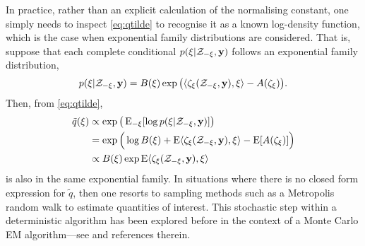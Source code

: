 In practice, rather than an explicit calculation of the normalising constant, one simply needs to inspect \cref{eq:qtilde} to recognise it as a known log-density function, which is the case when exponential family distributions are considered.
That is, suppose that each complete conditional $p(\xi|{\mathcal Z}_{-\xi}, {\mathbf y})$ follows an exponential family distribution,
\[
  p(\xi|{\mathcal Z}_{-\xi}, {\mathbf y}) = B(\xi)\exp \big(\langle\zeta_\xi({\mathcal Z}_{-\xi}, {\mathbf y}) , \xi\rangle - A(\zeta_\xi) \big).
\]
Then, from \cref{eq:qtilde},
\begin{align*}
  \tilde q(\xi)
  &\propto \exp\big(\operatorname{E}_{-\xi}[\log p(\xi|{\mathcal Z}_{-\xi}, {\mathbf y})] \big) \\
  &= \exp \Big(\log B(\xi) + \operatorname{E} \langle\zeta_\xi({\mathcal Z}_{-\xi}, {\mathbf y}) , \xi\rangle - \operatorname{E} [ A(\zeta_\xi) ] \Big) \\
  &\propto B(\xi)\exp \operatorname{E}\langle\zeta_\xi({\mathcal Z}_{-\xi}, {\mathbf y}) , \xi\rangle
\end{align*}
is also in the same exponential family.
In situations where there is no closed form expression for $\tilde q$, then one resorts to sampling methods such as a Metropolis random walk to estimate quantities of interest.
This stochastic step within a deterministic algorithm has been explored before in the context of a Monte Carlo EM algorithm---see \citet[§4, pp. 537--538]{meng1997algorithm} and references therein.

